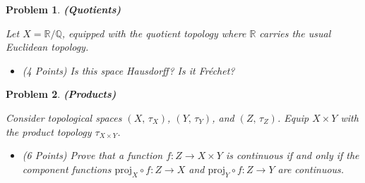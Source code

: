 \documentclass{article}
\theoremstyle{normal}
\newtheorem{problem}{Problem}
\begin{document}
    \begin{problem}
        \textbf{(Quotients)}
        \par\hfill\par
        Let $X=\mathbb{R}/\mathbb{Q}$, equipped with the quotient topology where
        $\mathbb{R}$ carries the usual Euclidean topology.
        \begin{itemize}
            \item (4 Points) Is this space Hausdorff? Is it Fr\'{e}chet?
        \end{itemize}
    \end{problem}
    \begin{problem}
        \textbf{(Products)}
        \par\hfill\par
        Consider topological spaces $(X,\,\tau_{X})$, $(Y,\,\tau_{Y})$, and
        $(Z,\,\tau_{Z})$. Equip $X\times{Y}$ with the product topology
        $\tau_{X\times{Y}}$.
        \begin{itemize}
            \item (6 Points) Prove that a function
                $f:Z\rightarrow{X}\times{Y}$ is continuous if and only if the
                component functions $\textrm{proj}_{X}\circ{f}:Z\rightarrow{X}$
                and $\textrm{proj}_{Y}\circ{f}:Z\rightarrow{Y}$ are continuous.
        \end{itemize}
    \end{problem}
\end{document}
